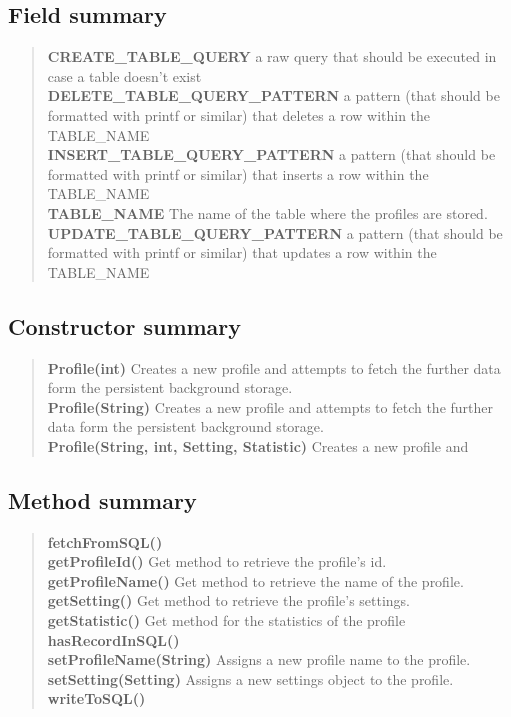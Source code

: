 \documentclass[11pt,a4paper]{report}
\begin{document}
{{{{\subsection{Field summary}{
\begin{verse}
{\bf CREATE\_TABLE\_QUERY} a raw query that should be executed in case a table doesn't exist\\
{\bf DELETE\_TABLE\_QUERY\_PATTERN} a pattern (that should be formatted with printf or similar) that deletes a row within the TABLE\_NAME\\
{\bf INSERT\_TABLE\_QUERY\_PATTERN} a pattern (that should be formatted with printf or similar) that inserts a row within the TABLE\_NAME\\
{\bf TABLE\_NAME} The name of the table where the profiles are stored.\\
{\bf UPDATE\_TABLE\_QUERY\_PATTERN} a pattern (that should be formatted with printf or similar) that updates a row within the TABLE\_NAME\\
\end{verse}
}
\subsection{Constructor summary}{
\begin{verse}
{\bf Profile(int)} Creates a new profile and attempts to fetch the further data form the persistent background storage.\\
{\bf Profile(String)} Creates a new profile and attempts to fetch the further data form the persistent background storage.\\
{\bf Profile(String, int, Setting, Statistic)} Creates a new profile and\\
\end{verse}
}
\subsection{Method summary}{
\begin{verse}
{\bf fetchFromSQL()} \\
{\bf getProfileId()} Get method to retrieve the profile's id.\\
{\bf getProfileName()} Get method to retrieve the name of the profile.\\
{\bf getSetting()} Get method to retrieve the profile's settings.\\
{\bf getStatistic()} Get method for the statistics of the profile\\
{\bf hasRecordInSQL()} \\
{\bf setProfileName(String)} Assigns a new profile name to the profile.\\
{\bf setSetting(Setting)} Assigns a new settings object to the profile.\\
{\bf writeToSQL()} \\
\end{verse}
}
}}}}
\end{document}
